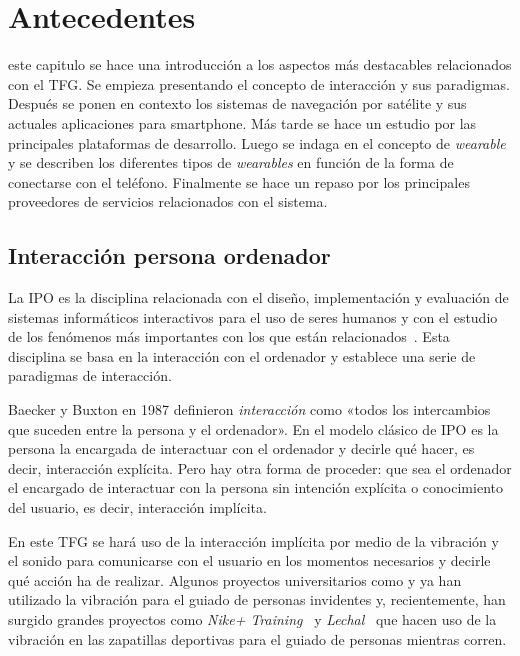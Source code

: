 \chapter{Antecedentes}
\label{chap:antecedentes}

 este capitulo se hace una introducción a los aspectos más destacables relacionados con
el \acs{TFG}. Se empieza presentando el concepto de interacción y sus paradigmas. Después se ponen
en contexto los sistemas de navegación por satélite y sus actuales aplicaciones para smartphone. Más
tarde se hace un estudio por las principales plataformas de desarrollo. Luego se indaga en el
concepto de \emph{wearable} y se describen los diferentes tipos de \emph{wearables} en función de la
forma de conectarse con el teléfono. Finalmente se hace un repaso por los principales proveedores de
servicios relacionados con el sistema.

\section{Interacción persona ordenador}

La \acf{IPO} es la disciplina relacionada con el diseño, implementación y evaluación de sistemas
informáticos interactivos para el uso de seres humanos y con el estudio de los fenómenos más
importantes con los que están relacionados~\cite{Hewett92}. Esta disciplina se basa en la
interacción con el ordenador y establece una serie de paradigmas de interacción.

Baecker y Buxton en 1987 definieron \emph{interacción} como «todos los intercambios que suceden
  entre la persona y el ordenador». En el modelo clásico de \acs{IPO} es la persona la encargada de
interactuar con el ordenador y decirle qué hacer, es decir, interacción explícita. Pero hay otra
forma de proceder: que sea el ordenador el encargado de interactuar con la persona sin intención
explícita o conocimiento del usuario, es decir, interacción implícita.

En este \acs{TFG} se hará uso de la interacción implícita por medio de la vibración y el sonido para
comunicarse con el usuario en los momentos necesarios y decirle qué acción ha de realizar. Algunos
proyectos universitarios como \cite{Boemo12} y \cite{Merino13} ya han utilizado la vibración para el
guiado de personas invidentes y, recientemente, han surgido grandes proyectos como \emph{Nike+
  Training}~\cite{Footlocker15} y \emph{Lechal}~\cite{Lechal} que hacen uso de la vibración en las
zapatillas deportivas para el guiado de personas mientras corren.\\

